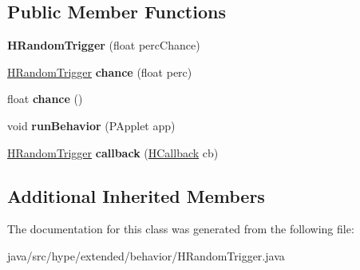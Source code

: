 \subsection*{Public Member Functions}
\begin{DoxyCompactItemize}
\item 
\hypertarget{classhype_1_1extended_1_1behavior_1_1_h_random_trigger_a46372f5839b0bbf5a733b4274f3297de}{{\bfseries H\-Random\-Trigger} (float perc\-Chance)}\label{classhype_1_1extended_1_1behavior_1_1_h_random_trigger_a46372f5839b0bbf5a733b4274f3297de}

\item 
\hypertarget{classhype_1_1extended_1_1behavior_1_1_h_random_trigger_aee186903e7b68d3737de314e3faddeac}{\hyperlink{classhype_1_1extended_1_1behavior_1_1_h_random_trigger}{H\-Random\-Trigger} {\bfseries chance} (float perc)}\label{classhype_1_1extended_1_1behavior_1_1_h_random_trigger_aee186903e7b68d3737de314e3faddeac}

\item 
\hypertarget{classhype_1_1extended_1_1behavior_1_1_h_random_trigger_a9e509fab96e9f0a209975ece715ac38f}{float {\bfseries chance} ()}\label{classhype_1_1extended_1_1behavior_1_1_h_random_trigger_a9e509fab96e9f0a209975ece715ac38f}

\item 
\hypertarget{classhype_1_1extended_1_1behavior_1_1_h_random_trigger_a16eb82e839caef4d885dbf5aca84c0fa}{void {\bfseries run\-Behavior} (P\-Applet app)}\label{classhype_1_1extended_1_1behavior_1_1_h_random_trigger_a16eb82e839caef4d885dbf5aca84c0fa}

\item 
\hypertarget{classhype_1_1extended_1_1behavior_1_1_h_random_trigger_aff77e0d939b9471517428e56a84f3b24}{\hyperlink{classhype_1_1extended_1_1behavior_1_1_h_random_trigger}{H\-Random\-Trigger} {\bfseries callback} (\hyperlink{interfacehype_1_1core_1_1interfaces_1_1_h_callback}{H\-Callback} cb)}\label{classhype_1_1extended_1_1behavior_1_1_h_random_trigger_aff77e0d939b9471517428e56a84f3b24}

\end{DoxyCompactItemize}
\subsection*{Additional Inherited Members}


The documentation for this class was generated from the following file\-:\begin{DoxyCompactItemize}
\item 
java/src/hype/extended/behavior/H\-Random\-Trigger.\-java\end{DoxyCompactItemize}
